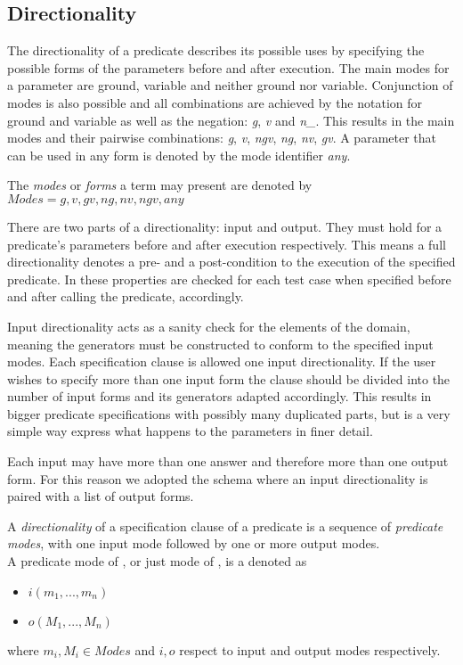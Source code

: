 \subsection{Directionality}
The directionality of a predicate describes its possible uses by
specifying the possible forms of the parameters before and after
execution.
%
The main modes for a parameter are ground, variable and neither ground
nor variable.
%
Conjunction of modes is also possible and all combinations are achieved
by the notation for ground and variable as well as the negation:
\emph{g}, \emph{v} and \emph{n\_}.
%
This results in the main modes and their pairwise combinations: \emph{g},
\emph{v}, \emph{ngv},  \emph{ng}, \emph{nv}, \emph{gv}.
%
A parameter that can be used in any form is denoted by the mode
identifier \emph{any}.


\begin{definition}
\label{def:modes}
The \emph{modes} or \emph{forms} a term may present are denoted by\\
 $Modes = {g, v, gv, ng, nv, ngv, any}$
\end{definition}


There are two parts of a directionality: input and output.
%
They must hold for a predicate's parameters before and after execution
respectively.
%
This means a full directionality denotes a pre- and a post-condition to
the execution of the specified predicate.
%
In \plqc{} these properties are checked for each test case when
specified before and after calling the predicate, accordingly.


Input directionality acts as a sanity check for the elements of the
domain, meaning the generators must be constructed to conform to the
specified input modes.
%
Each specification clause is allowed one input directionality.
%
If the user wishes to specify more than one input form the clause should
be divided into the number of input forms and its generators adapted
accordingly.
%
This results in bigger predicate specifications with possibly many
duplicated parts, but is a very simple way express what happens to the
parameters in finer detail.


Each input may have more than one answer and therefore more than one
output form.
%
For this reason we adopted the schema where an input directionality is
paired with a list of output forms.


\begin{definition}
\label{def:directionality}
A \emph{directionality} of a specification clause of a predicate
 is a sequence of \emph{predicate modes}, with one input mode
followed by one or more output modes.
\\
A predicate mode of , or just mode of , is a denoted as
\begin{itemize}
  \item $i(m_1, ..., m_n)$
  \item $o(M_1, ..., M_n)$
\end{itemize}
where $m_i,M_i \in Modes$ and $i, o$ respect to input and output modes
respectively.
\end{definition}



